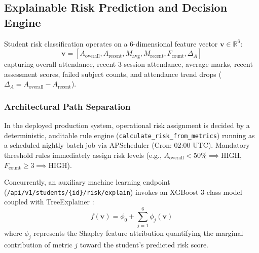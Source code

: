 \documentclass[conference]{IEEEtran}
\begin{document}
\subsection{Explainable Risk Prediction and Decision Engine}
Student risk classification operates on a 6-dimensional feature vector $\mathbf{v} \in \mathbb{R}^6$:
\begin{equation}
\mathbf{v} = [A_{\text{overall}}, A_{\text{recent}}, M_{\text{avg}}, M_{\text{recent}}, F_{\text{count}}, \Delta_A]
\end{equation}
capturing overall attendance, recent 3-session attendance, average marks, recent assessment scores, failed subject counts, and attendance trend drops ($\Delta_A = A_{\text{overall}} - A_{\text{recent}}$).

\subsubsection{Architectural Path Separation}
In the deployed production system, operational risk assignment is decided by a deterministic, auditable rule engine (\texttt{calculate\_risk\_from\_metrics}) running as a scheduled nightly batch job via APScheduler (Cron: 02:00 UTC). Mandatory threshold rules immediately assign risk levels (e.g., $A_{\text{overall}} < 50\% \implies \text{HIGH}$, $F_{\text{count}} \ge 3 \implies \text{HIGH}$).

Concurrently, an auxiliary machine learning endpoint (\texttt{/api/v1/students/\{id\}/risk/explain}) invokes an XGBoost 3-class model coupled with TreeExplainer \cite{lundberg2017unified}:
\begin{equation}
f(\mathbf{v}) = \phi_0 + \sum_{j=1}^{6} \phi_j(\mathbf{v})
\end{equation}
where $\phi_j$ represents the Shapley feature attribution quantifying the marginal contribution of metric $j$ toward the student's predicted risk score.
\end{document}
